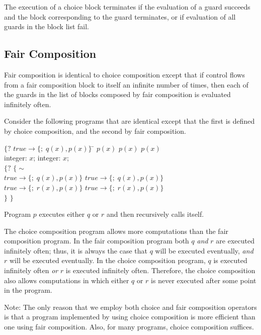 The execution of a choice block terminates if the evaluation of a guard 
succeeds and the block corresponding to the guard terminates, or if
evaluation of all guards in the block list fail.


\subsection{Fair Composition}
Fair composition is identical to choice composition except that
if control flows from a fair composition block to itself an
infinite number of times, then each of the guards in the list of
blocks composed by fair composition is evaluated infinitely often.

Consider the following programs that are identical except that the
first is defined by choice composition, and the second by fair
composition. \\

\vspace{5mm} 

\noindent
\begin{tabbing}
$\{?$  $true \rightarrow \{ ; \; q(x), p(x) \}$ \hspace{1cm}\= $p(x)$ \kill
$p(x)$  \> $p(x)$ \\
integer: $x$; \> integer: $x$;\\
$\{?$ \> $\{\sim$ \\
$true \rightarrow \{ ; \; q(x), p(x) \} $ 
\> $true \rightarrow \{ ; \; q(x), p(x) \} $ \\
$true \rightarrow \{ ; \; r(x), p(x) \}  $ 
\> $true \rightarrow \{ ; \; r(x), p(x) \}  $ \\
$\}$ \> $\}$
\end{tabbing} 
Program $p$ executes either $q$ or $r$ and then recursively calls itself.

The choice composition program allows more computations than the fair
composition program.
In the fair composition program both $q$ {\em and} 
$r$ are executed infinitely
often;
thus, it is always the case that $q$ will be executed eventually, {\em and}
$r$ will be executed eventually.
In the choice composition program, $q$ is executed infinitely often {\em or}
$r$ is executed infinitely often.
Therefore, the choice composition also allows computations in which 
either $q$ or $r$ is never executed after some point in the program.


Note: The only reason that we employ both choice and fair composition
operators is that a program implemented by using choice composition
is more efficient than one using fair composition.  Also, for
many programs, choice composition suffices.

